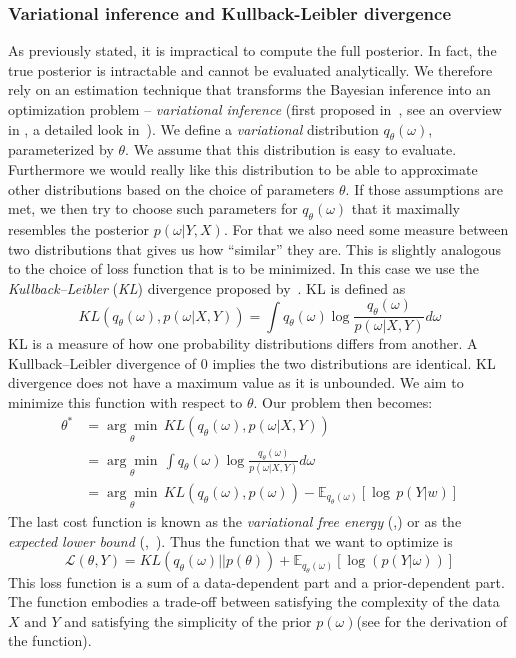 \documentclass[12pt,a4paper,twoside]{scrartcl}
\numberwithin{equation}{section}
\begin{document}
\subsubsection{Variational inference and Kullback-Leibler divergence}\label{sec:var-inference}
As previously stated, it is impractical to compute the full posterior. In fact, the true posterior is intractable and cannot be evaluated analytically. We therefore rely on an estimation technique that transforms the Bayesian inference into an optimization problem -- \emph{variational inference} (first proposed in~\cite{jordan1999}, see an overview in \cite{blei2016}, a detailed look in~\cite{fox2012}). We define a \emph{variational} distribution \(q_{\theta}(\omega)\), parameterized by \(\theta \). We assume that this distribution is easy to evaluate. Furthermore we would really like this distribution to be able to approximate other distributions based on the choice of parameters \(\theta\). If those assumptions are met, we then try to choose such parameters for \(q_{\theta}(\omega)\) that it maximally resembles the posterior \(p(\omega|Y,X)\). For that we also need some measure between two distributions that gives us how ``similar'' they are. This is slightly analogous to the choice of loss function that is to be minimized. In this case we use the \emph{Kullback–Leibler} (\emph{KL}) divergence proposed by~\cite{kullback1951}. KL is defined as
\begin{equation}
  KL(q_{\theta}(\omega), p(\omega | X, Y)) = \int q_{\theta}(\omega) \log \frac{q_{\theta}(\omega)}{p(\omega | X, Y)}d\omega 
\end{equation}
KL is a measure of how one probability distributions differs from another. A Kullback–Leibler divergence of \(0\) implies the two distributions are identical. KL divergence does not have a maximum value as it is unbounded. We aim to minimize this function with respect to \(\theta\). Our problem then becomes:
\begin{align}
  \theta^* &= \underset{\theta}{\arg\min} \,  KL(q_{\theta}(\omega), p(\omega | X, Y))\\
           &= \underset{\theta}{\arg\min}\, \int q_{\theta}(\omega) \log \frac{q_{\theta}(\omega)}{p(\omega | X, Y)}d\omega \\
           & = \underset{\theta}{\arg\min}\,  KL(q_{\theta}(\omega), p(\omega)) - \mathbb{E}_{q_{\theta}(\omega)}[\log\, p(Y|w)]
\end{align}
The last cost function is known as the \emph{variational free energy} (\cite{neal1998},\cite{blundell2015}) or as the \emph{expected lower bound} (\cite{fox2012},~\cite{saul1996}). Thus the function that we want to optimize is
\begin{equation}
  \mathcal{L}(\theta, Y) = KL(q_{\theta}(\omega)||p(\theta)) + \mathbb{E}_{q_{\theta}(\omega)}[\log(p(Y|\omega))]
\end{equation}
This loss function is a sum of a data-dependent part and a prior-dependent part. The function embodies a trade-off between satisfying the complexity of the data \(X \text{ and } Y \) and satisfying the simplicity of the prior \(p(\omega)\)(see \cite{blundell2015} for the derivation of the function).
\end{document}

